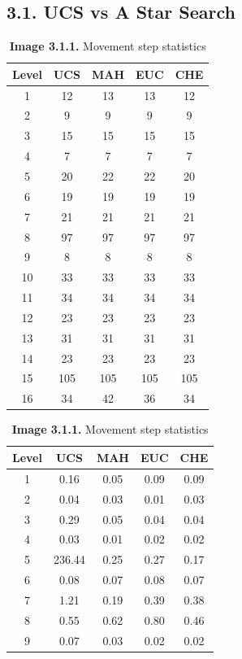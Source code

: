 \documentclass[english, a4paper,12pt]{article}
\begin{document}
\subsection*{3.1. UCS vs A Star Search}
\begin{table}[h]
\small\begin{minipage}{0.5\textwidth}
\centering
\begin{tabular}{|c|c|c|c|c|}
\hline
Level & UCS & MAH & EUC & CHE \\
\hline
1 & 12 & 13 & 13 & 12 \\
2 & 9 & 9 & 9 & 9 \\
3 & 15 & 15 & 15 & 15 \\
4 & 7 & 7 & 7 & 7\\
5 & 20 & 22 & 22 & 20\\
6 & 19 & 19 & 19 & 19\\
7 & 21 & 21 & 21 & 21\\
8 & 97 & 97 & 97 & 97\\
9 & 8 & 8 & 8 & 8\\
10 & 33 & 33 & 33 & 33\\
11 & 34 & 34 & 34 & 34\\
12 & 23 & 23 & 23 & 23\\
13 & 31 & 31 & 31 & 31\\
14 & 23 & 23 & 23 & 23 \\
15 & 105 & 105 & 105 & 105\\
16 & 34 & 42 & 36 & 34\\
\hline
\end{tabular}
\caption*{\textbf{Image 3.1.1.} Movement step statistics}
\end{minipage}
\small\begin{minipage}{0.5\textwidth}
\centering
\small\begin{tabular}{|c|c|c|c|c|}
\hline
Level & UCS & MAH & EUC & CHE \\
\hline
1 & 0.16 & 0.05 & 0.09 & 0.09\\
2 & 0.04 & 0.03 & 0.01 & 0.03 \\
3 & 0.29 & 0.05 & 0.04 & 0.04 \\
4 & 0.03 & 0.01 & 0.02 & 0.02\\
5 & 236.44 & 0.25 & 0.27 & 0.17\\
6 & 0.08 & 0.07 & 0.08 & 0.07\\
7 & 1.21 & 0.19 & 0.39 & 0.38\\
8 & 0.55 & 0.62 & 0.80 & 0.46\\
9 & 0.07 & 0.03 & 0.02 & 0.02\\

\end{tabular}
\end{minipage}
\end{table}
\end{document}
